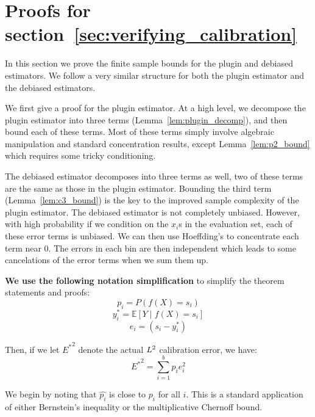 \newpage

\section{Proofs for section~\ref{sec:verifying_calibration}}
\label{sec:verifying_calibration_appendix}

In this section we prove the finite sample bounds for the plugin and debiased estimators. We follow a very similar structure for both the plugin estimator and the debiased estimators.

We first give a proof for the plugin estimator. At a high level, we decompose the plugin estimator into three terms (Lemma~\ref{lem:plugin_decomp}), and then bound each of these terms. Most of these terms simply involve algebraic manipulation and standard concentration results, except Lemma~\ref{lem:p2_bound} which requires some tricky conditioning.

The debiased estimator decomposes into three terms as well, two of these terms are the same as those in the plugin estimator. Bounding the third term (Lemma~\ref{lem:c3_bound}) is the key to the improved sample complexity of the plugin estimator. The debiased estimator is not completely unbiased. However, with high probability if we condition on the $x_i$s in the evaluation set, each of these error terms is unbiased. We can then use Hoeffding's to concentrate each term near 0. The errors in each bin are then independent which leads to some cancelations of the error terms when we sum them up.

\textbf{We use the following notation simplification} to simplify the theorem statements and proofs:
\[ p_i = P(f(X) = s_i) \]
\[ y_i^* = \mathbb{E}[Y \; | \; f(X) = s_i] \]
\[ e_i = (s_i - y_i^*) \]

Then, if we let ${E^*}^2$ denote the actual $L^2$ calibration error, we have:
\[ {E^*}^2 = \sum_{i=1}^b p_i e_i^2 \]


We begin by noting that $\hat{p_i}$ is close to $p_i$ for all $i$. This is a standard application of either Bernstein's inequality or the multiplicative Chernoff bound.

